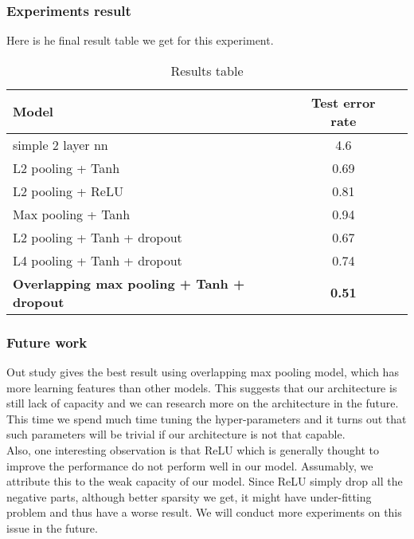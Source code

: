 \documentclass[paper=a4, fontsize=11pt]{scrartcl} %
\numberwithin{equation}{section} %
\numberwithin{figure}{section} %
\numberwithin{table}{section} %
\begin{document}
\subsubsection{\textbf{Experiments result}}
Here is he final result table we get for this experiment. \begin{table}[h]
 \centering 
\begin{tabular}{lcc}  
\hline
Model & Test error rate\\ \hline  
simple 2 layer nn & 4.6\\         
L2 pooling + Tanh & 0.69\\        
L2 pooling + ReLU & 0.81 \\ 
Max pooling + Tanh &  0.94 \\
L2 pooling + Tanh + dropout & 0.67 \\
L4 pooling + Tanh + dropout & 0.74\\
\bf{Overlapping max pooling + Tanh + dropout} & \bf{0.51} \\ \hline
\end{tabular}
\caption{Results table}
\end{table}
\newpage

\subsubsection{\textbf{Future work}}
Out study gives the best result using overlapping max pooling model, which has more learning features than other models. This suggests that our architecture is still lack of capacity and we can research more on the architecture in the future. This time we spend much time tuning the hyper-parameters and it turns out that such parameters will be trivial if our architecture is not that capable.\\

Also, one interesting observation is that ReLU which is generally thought to improve the performance do not perform well in our model. Assumably, we attribute this to the weak capacity of our model. Since ReLU simply drop all the negative parts, although better sparsity we get, it might have under-fitting problem and thus have a worse result. We will conduct more experiments on this issue in the future.




\end{document}
